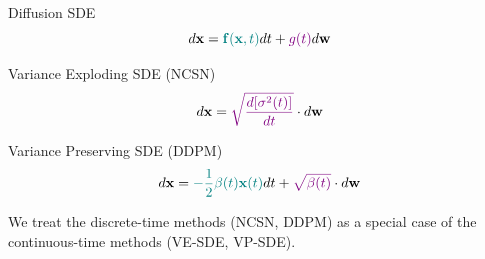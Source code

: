 \documentclass{beamer}
\renewcommand{\eqpause}{}
\begin{document}
\begin{frame}{Diffusion SDE}
	\vspace{-0.3cm}
	\[
		d\mathbf{x} = {\color{teal}\mathbf{f}(\mathbf{x}, t)} dt + {\color{violet}g(t)} d \mathbf{w}
	\]
    \eqpause
	\vspace{-0.3cm}
	\begin{block}{Variance Exploding SDE (NCSN)}
		\vspace{-0.3cm}
		\[
			d \mathbf{x} = {\color{violet}\sqrt{\frac{ d [\sigma^2(t)]}{dt}}} \cdot d \mathbf{w}
		\]
		\vspace{-0.3cm}
	\end{block}
	\begin{block}{Variance Preserving SDE (DDPM)}
		\vspace{-0.3cm}
		\[
			d \mathbf{x} = {\color{teal}- \frac{1}{2} \beta(t) \mathbf{x}(t)} dt + {\color{violet}\sqrt{\beta(t)}} \cdot d \mathbf{w}
		\]
	\end{block}
	We treat the discrete-time methods (NCSN, DDPM) as a special case of the continuous-time methods (VE-SDE, VP-SDE).
\end{frame}
\end{document}
